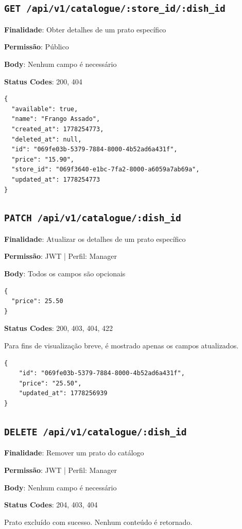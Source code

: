 \subsection{\texttt{GET /api/v1/catalogue/:store\_id/:dish\_id}}

\noindent\textbf{Finalidade}: Obter detalhes de um prato específico

\noindent\textbf{Permissão}: Público

\noindent\textbf{Body}: Nenhum campo é necessário

\noindent\textbf{Status Codes}: 200, 404

\begin{tcolorbox}[colback=green!5, colframe=black, title=\textbf{200 OK}]
\begin{verbatim}
{
  "available": true,
  "name": "Frango Assado",
  "created_at": 1778254773,
  "deleted_at": null,
  "id": "069fe03b-5379-7884-8000-4b52ad6a431f",
  "price": "15.90",
  "store_id": "069f3640-e1bc-7fa2-8000-a6059a7ab69a",
  "updated_at": 1778254773
}
\end{verbatim}
\end{tcolorbox}

\subsection{\texttt{PATCH /api/v1/catalogue/:dish\_id}}

\noindent\textbf{Finalidade}: Atualizar os detalhes de um prato específico

\noindent\textbf{Permissão}: JWT | Perfil: Manager

\noindent\textbf{Body}: Todos os campos são opcionais

\begin{verbatim}
{
  "price": 25.50
}
\end{verbatim}

\noindent\textbf{Status Codes}: 200, 403, 404, 422

\begin{tcolorbox}[colback=green!5, colframe=black, title=\textbf{200 OK}]
Para fins de visualização breve, é mostrado apenas os campos atualizados.
\begin{verbatim}
{
    "id": "069fe03b-5379-7884-8000-4b52ad6a431f",
    "price": "25.50",
    "updated_at": 1778256939
}
\end{verbatim}
\end{tcolorbox}

\subsection{\texttt{DELETE /api/v1/catalogue/:dish\_id}}

\noindent\textbf{Finalidade}: Remover um prato do catálogo

\noindent\textbf{Permissão}: JWT | Perfil: Manager

\noindent\textbf{Body}: Nenhum campo é necessário

\noindent\textbf{Status Codes}: 204, 403, 404

\begin{tcolorbox}[colback=green!5, colframe=black, title=\textbf{204 No Content}]
Prato excluído com sucesso. Nenhum conteúdo é retornado.
\end{tcolorbox}
